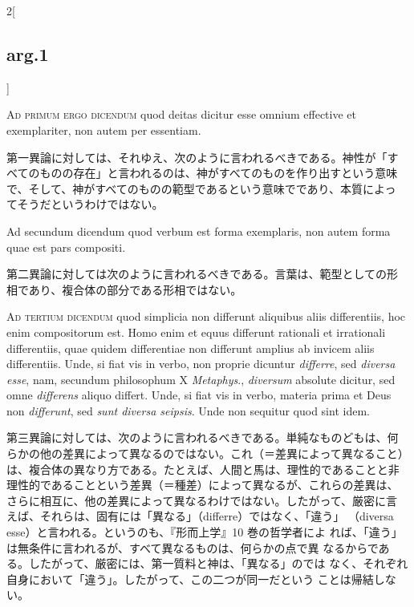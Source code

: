 \documentclass[paper=a4paper,fontsize=10pt,jafontsize=9pt,titlepage]{jlreq}
\begin{document}
\begin{paracol}{2}[\subsection{arg.1}]
\switchcolumn*[\subsection{ad.1}]

{\scshape Ad primum ergo dicendum} quod deitas dicitur esse omnium
 effective et exemplariter, non autem per essentiam.

\switchcolumn

第一異論に対しては、それゆえ、次のように言われるべきである。神性が「す
べてのものの存在」と言われるのは、神がすべてのものを作り出すという意味
で、そして、神がすべてのものの範型であるという意味でであり、本質によっ
てそうだというわけではない。

\switchcolumn*[\subsection{ad.2}]

Ad secundum dicendum{\scshape } quod verbum est forma exemplaris, non
autem forma quae est pars compositi.

\switchcolumn

第二異論に対しては次のように言われるべきである。言葉は、範型としての形
相であり、複合体の部分である形相ではない。

\switchcolumn*[\subsection{ad.3}]

{\scshape Ad tertium dicendum} quod simplicia non differunt aliquibus
aliis differentiis, hoc enim compositorum est. Homo enim et equus
differunt rationali et irrationali differentiis, quae quidem
differentiae non differunt amplius ab invicem aliis
differentiis. Unde, si fiat vis in verbo, non proprie dicuntur
{\itshape differre}, sed {\itshape diversa esse}, nam, secundum
philosophum X {\itshape Metaphys}., {\itshape diversum} absolute
dicitur, sed omne {\itshape differens} aliquo differt. Unde, si fiat
vis in verbo, materia prima et Deus non {\itshape differunt}, sed
{\itshape sunt diversa seipsis}. Unde non sequitur quod sint idem.

\switchcolumn

第三異論に対しては、次のように言われるべきである。単純なものどもは、何
らかの他の差異によって異なるのではない。これ（＝差異によって異なること）
は、複合体の異なり方である。たとえば、人間と馬は、理性的であることと非
理性的であることという差異（＝種差）によって異なるが、これらの差異は、
さらに相互に、他の差異によって異なるわけではない。したがって、厳密に言
えば、それらは、固有には「異なる」（differre）ではなく、「違う」
（diversa esse）と言われる。というのも、『形而上学』10 巻の哲学者によ
れば、「違う」は無条件に言われるが、すべて異なるものは、何らかの点で異
なるからである。したがって、厳密には、第一質料と神は、「異なる」のでは
なく、それぞれ自身において「違う」。したがって、この二つが同一だという
 ことは帰結しない。

\end{paracol}
\end{document}
